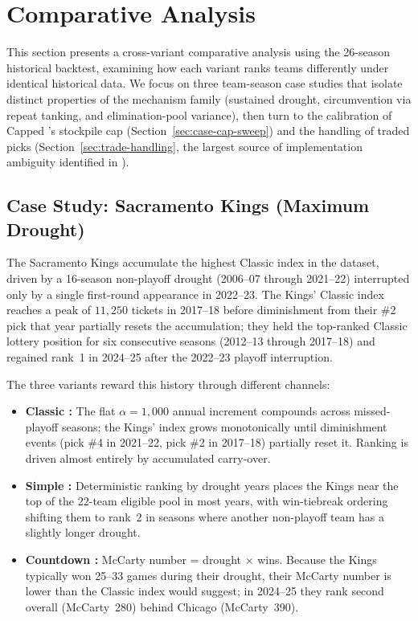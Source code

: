 \section{Comparative Analysis}
\label{sec:comparison}


This section presents a cross-variant comparative analysis using the 26-season historical backtest, examining how each \cola{} variant ranks teams differently under identical historical data. We focus on three team-season case studies that isolate distinct properties of the mechanism family (sustained drought, circumvention via repeat tanking, and elimination-pool variance), then turn to the calibration of Capped \cola{}'s stockpile cap (Section~\ref{sec:case-cap-sweep}) and the handling of traded picks (Section~\ref{sec:trade-handling}, the largest source of implementation ambiguity identified in \citet{highley2026solvable4}).

\subsection{Case Study: Sacramento Kings (Maximum Drought)}
\label{sec:case-sac}

The Sacramento Kings accumulate the highest Classic \cola{} index in the dataset, driven by a 16-season non-playoff drought (2006--07 through 2021--22) interrupted only by a single first-round appearance in 2022--23. The Kings' Classic index reaches a peak of $11{,}250$ tickets in 2017--18 before diminishment from their \#2 pick that year partially resets the accumulation; they held the top-ranked Classic \cola{} lottery position for six consecutive seasons (2012--13 through 2017--18) and regained rank~1 in 2024--25 after the 2022--23 playoff interruption.

The three \cola{} variants reward this history through different channels:
\begin{itemize}
    \item \textbf{Classic \cola{}:} The flat $\alpha = 1{,}000$ annual increment compounds across missed-playoff seasons; the Kings' index grows monotonically until diminishment events (pick \#4 in 2021--22, pick \#2 in 2017--18) partially reset it. Ranking is driven almost entirely by accumulated carry-over.
    \item \textbf{Simple \cola{}:} Deterministic ranking by drought years places the Kings near the top of the 22-team eligible pool in most years, with win-tiebreak ordering shifting them to rank~2 in seasons where another non-playoff team has a slightly longer drought.
    \item \textbf{Countdown \cola{}:} McCarty number = drought $\times$ wins. Because the Kings typically won 25--33 games during their drought, their McCarty number is lower than the Classic \cola{} index would suggest; in 2024--25 they rank second overall (McCarty~280) behind Chicago (McCarty~390).
\end{itemize}

